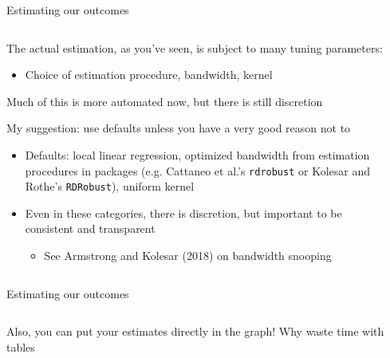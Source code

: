 \documentclass[notes,11pt, aspectratio=169]{beamer}
\newenvironment{wideitemize}{\itemize\addtolength{\itemsep}{10pt}}{\enditemize}
\begin{document}
\begin{frame}{Estimating our outcomes}
    \begin{columns}[onlytextwidth, T] %
      \begin{column}{.7\textwidth}
        \begin{wideitemize}
        \item The actual estimation, as you've seen, is subject to many tuning parameters:
          \begin{itemize}
          \item Choice of estimation procedure, bandwidth, kernel 
          \end{itemize}
        \item Much of this is more automated now, but there is still discretion
        \item My suggestion: use defaults unless you have a very good reason not to
          \begin{itemize}
          \item Defaults: local linear regression, optimized bandwidth
            from estimation procedures in packages (e.g. Cattaneo et
            al.'s \texttt{rdrobust} or Kolesar and Rothe's
            \texttt{RDRobust}), uniform kernel
          \item Even in these categories, there is discretion, but
            important to be consistent and transparent
            \begin{itemize}
            \item See Armstrong and Kolesar (2018) on bandwidth snooping
            \end{itemize}
          \end{itemize}
        \end{wideitemize}
      \end{column}%
      \hfill%
      \begin{column}{.3\textwidth}
      \end{column}%
    \end{columns}
\end{frame}

\begin{frame}{Estimating our outcomes}
    \begin{columns}[onlytextwidth, T] %
      \begin{column}{.5\textwidth}
        \begin{wideitemize}
        \item Also, you can put your estimates directly in the graph! Why waste time with tables
        \end{wideitemize}
      \end{column}%
      \hfill%
      \begin{column}{.5\textwidth}
      \end{column}%
    \end{columns}
\end{frame}
\end{document}

